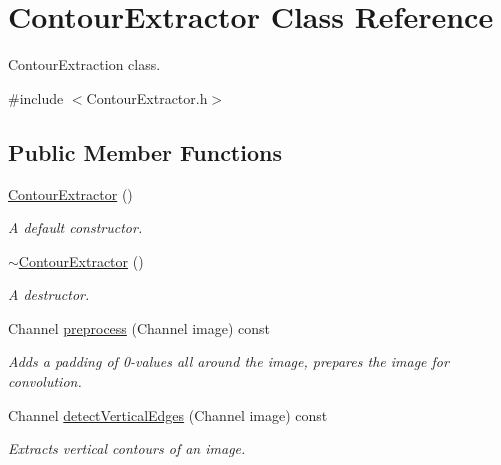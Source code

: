 \hypertarget{class_contour_extractor}{}\section{Contour\+Extractor Class Reference}
\label{class_contour_extractor}


Contour\+Extraction class.  




{\ttfamily \#include $<$Contour\+Extractor.\+h$>$}

\subsection*{Public Member Functions}
\begin{DoxyCompactItemize}
\item 
\mbox{\label{class_contour_extractor_ad0370155907a30ec5763f447987a0f5c}} 
\hyperlink{class_contour_extractor_ad0370155907a30ec5763f447987a0f5c}{Contour\+Extractor} ()
\begin{DoxyCompactList}\small\item\em A default constructor. \end{DoxyCompactList}\item 
\mbox{\label{class_contour_extractor_a68a81d44d414657b4fd8d470416e8ff4}} 
\hyperlink{class_contour_extractor_a68a81d44d414657b4fd8d470416e8ff4}{$\sim$\+Contour\+Extractor} ()
\begin{DoxyCompactList}\small\item\em A destructor. \end{DoxyCompactList}\item 
Channel \hyperlink{class_contour_extractor_a9c75f77327e9b74e3161963c4784d205}{preprocess} (Channel image) const
\begin{DoxyCompactList}\small\item\em Adds a padding of 0-\/values all around the image, prepares the image for convolution. \end{DoxyCompactList}\item 
Channel \hyperlink{class_contour_extractor_a3aafc89132984a7b7042f748439b58fb}{detect\+Vertical\+Edges} (Channel image) const
\begin{DoxyCompactList}\small\item\em Extracts vertical contours of an image. \end{DoxyCompactList}\item 

\end{DoxyCompactItemize}
